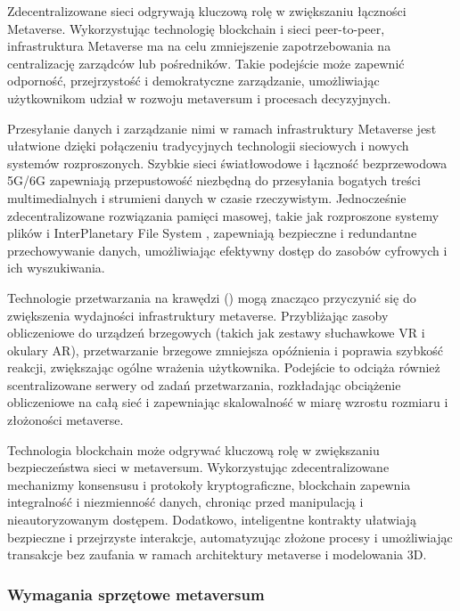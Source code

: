 Zdecentralizowane sieci odgrywają kluczową rolę w zwiększaniu łączności Metaverse. Wykorzystując technologię blockchain i sieci peer-to-peer, infrastruktura Metaverse ma na celu zmniejszenie zapotrzebowania na centralizację zarządców lub pośredników. Takie podejście może zapewnić odporność, przejrzystość i demokratyczne zarządzanie, umożliwiając użytkownikom udział w rozwoju metaversum i procesach decyzyjnych\cite{metaverseInfrastructureIEEE}.

Przesyłanie danych i zarządzanie nimi w ramach infrastruktury Metaverse jest ułatwione dzięki połączeniu tradycyjnych technologii sieciowych i nowych systemów rozproszonych. Szybkie sieci światłowodowe i łączność bezprzewodowa 5G/6G zapewniają przepustowość niezbędną do przesyłania bogatych treści multimedialnych i strumieni danych w czasie rzeczywistym. Jednocześnie zdecentralizowane rozwiązania pamięci masowej, takie jak rozproszone systemy plików i InterPlanetary File System , zapewniają bezpieczne i redundantne przechowywanie danych, umożliwiając efektywny dostęp do zasobów cyfrowych i ich wyszukiwania\cite{metaverseInfrastructureIEEE}.

Technologie przetwarzania na krawędzi () mogą znacząco przyczynić się do zwiększenia wydajności infrastruktury metaverse. Przybliżając zasoby obliczeniowe do urządzeń brzegowych (takich jak zestawy słuchawkowe VR i okulary AR), przetwarzanie brzegowe zmniejsza opóźnienia i poprawia szybkość reakcji, zwiększając ogólne wrażenia użytkownika. Podejście to odciąża również scentralizowane serwery od zadań przetwarzania, rozkładając obciążenie obliczeniowe na całą sieć i zapewniając skalowalność w miarę wzrostu rozmiaru i złożoności metaverse\cite{metaverseInfrastructureIEEE}.

Technologia blockchain może odgrywać kluczową rolę w zwiększaniu bezpieczeństwa sieci w metaversum. Wykorzystując zdecentralizowane mechanizmy konsensusu i protokoły kryptograficzne, blockchain zapewnia integralność i niezmienność danych, chroniąc przed manipulacją i nieautoryzowanym dostępem. Dodatkowo, inteligentne kontrakty ułatwiają bezpieczne i przejrzyste interakcje, automatyzując złożone procesy i umożliwiając transakcje bez zaufania w ramach architektury metaverse i modelowania 3D\cite{metaverseInfrastructureIEEE}.

\subsubsection{Wymagania sprzętowe metaversum}

